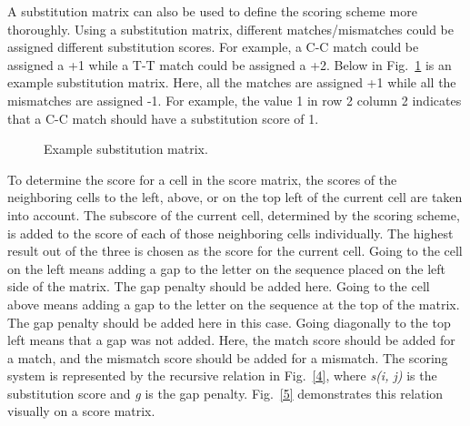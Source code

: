 \documentclass[conference]{IEEEtran}
\begin{document}
A substitution matrix can also be used to define the scoring scheme more thoroughly. Using a substitution matrix, different matches/mismatches could be assigned different substitution scores. For example, a C-C match could be assigned a +1 while a T-T match could be assigned a +2. Below in Fig.~\ref{3} is an example substitution matrix. Here, all the matches are assigned +1 while all the mismatches are assigned -1. For example, the value 1 in row 2 column 2 indicates that a C-C match should have a substitution score of 1.

\begin{figure}[htbp]
\centerline{}
\caption{Example substitution matrix. \cite{vladimir}}
\label{3}
\end{figure}

To determine the score for a cell in the score matrix, the scores of the neighboring cells to the left, above, or on the top left of the current cell are taken into account. The subscore of the current cell, determined by the scoring scheme, is added to the score of each of those neighboring cells individually. The highest result out of the three is chosen as the score for the current cell. Going to the cell on the left means adding a gap to the letter on the sequence placed on the left side of the matrix. The gap penalty should be added here. Going to the cell above means adding a gap to the letter on the sequence at the top of the matrix. The gap penalty should be added here in this case. Going diagonally to the top left means that a gap was not added. Here, the match score should be added for a match, and the mismatch score should be added for a mismatch. The scoring system is represented by the recursive relation in Fig.~\ref{4}, where \textit{s(i, j)} is the substitution score and \textit{g} is the gap penalty. Fig.~\ref{5} demonstrates this relation visually on a score matrix.
\end{document}
